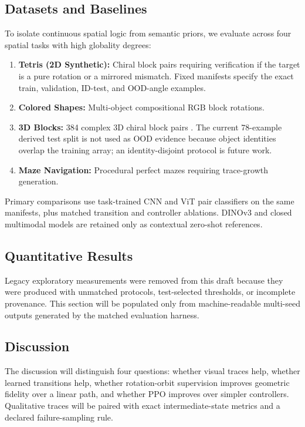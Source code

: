 \documentclass{article}
\begin{document}
\subsection{Datasets and Baselines}
To isolate continuous spatial logic from semantic priors, we evaluate across four spatial tasks with high globality degrees:
\begin{enumerate}
    \item \textbf{Tetris (2D Synthetic):} Chiral block pairs requiring verification if the target is a pure rotation or a mirrored mismatch. Fixed manifests specify the exact train, validation, ID-test, and OOD-angle examples.
    \item \textbf{Colored Shapes:} Multi-object compositional RGB block rotations.
    \item \textbf{3D Blocks:} 384 complex 3D chiral block pairs \citep{ganis2015new}. The current 78-example derived test split is not used as OOD evidence because object identities overlap the training array; an identity-disjoint protocol is future work.
    \item \textbf{Maze Navigation:} Procedural perfect mazes requiring trace-growth generation.
\end{enumerate}

Primary comparisons use task-trained CNN and ViT pair classifiers on the same manifests, plus matched transition and controller ablations. DINOv3 and closed multimodal models are retained only as contextual zero-shot references.

\subsection{Quantitative Results}

Legacy exploratory measurements were removed from this draft because they were produced with unmatched protocols, test-selected thresholds, or incomplete provenance. This section will be populated only from machine-readable multi-seed outputs generated by the matched evaluation harness.


\subsection{Discussion}

The discussion will distinguish four questions: whether visual traces help, whether learned transitions help, whether rotation-orbit supervision improves geometric fidelity over a linear path, and whether PPO improves over simpler controllers. Qualitative traces will be paired with exact intermediate-state metrics and a declared failure-sampling rule.
\end{document}
